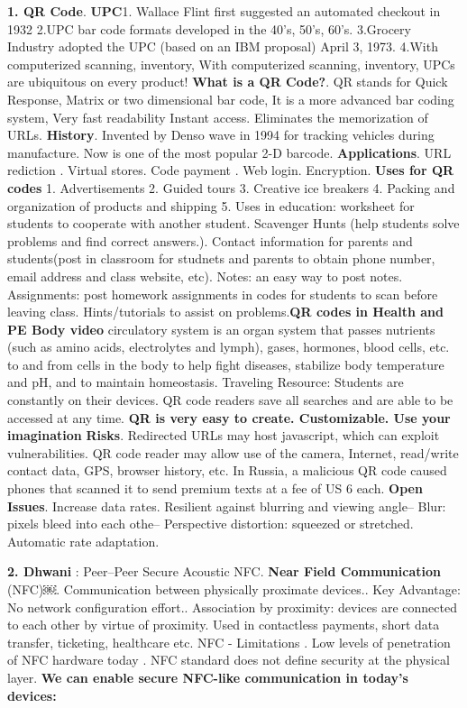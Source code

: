 \documentclass[8pt]{extarticle}
\begin{document}
\begin{multicols}{2}
\textbf{1. QR Code}. \textbf{UPC}1. Wallace Flint first suggested an automated checkout in 1932 2.UPC bar code formats developed in the 40’s, 50’s, 60’s. 3.Grocery Industry adopted the UPC (based on an IBM proposal) April 3, 1973. 4.With computerized scanning, inventory, With computerized scanning, inventory, UPCs are ubiquitous on every product! \textbf{What is a QR Code?}. QR stands for Quick Response, Matrix or two dimensional bar code, It is a more advanced bar coding system, Very fast readability Instant access. Eliminates the memorization of URLs. \textbf{History}. Invented by Denso wave in 1994 for tracking vehicles during manufacture. Now is one of the most popular 2-D barcode. \textbf{Applications}. URL rediction . Virtual stores. Code payment . Web login. Encryption. \textbf{Uses for QR codes} 1. Advertisements 2. Guided tours 3. Creative ice breakers 4. Packing and organization of products and shipping 5. Uses in education: worksheet for students to cooperate with another student. Scavenger Hunts (help students solve problems and find correct answers.). Contact information for parents and students(post in classroom for studnets and parents to obtain phone number, email address and class website, etc). Notes: an easy way to post notes. Assignments: post homework assignments in codes for students to scan before leaving class. Hints/tutorials to assist on problems.\textbf{QR codes in Health and PE Body video} circulatory system is an organ system that passes nutrients (such as amino acids, electrolytes and lymph), gases, hormones, blood cells, etc. to and from cells in the body to help fight diseases, stabilize body temperature and pH, and to maintain homeostasis. Traveling Resource: 
Students are constantly on their devices. QR code readers save all searches and are able to be accessed at any time. \textbf{QR is very easy to create. Customizable. Use your imagination} \textbf{Risks}. Redirected URLs may host javascript, which can exploit vulnerabilities. QR code reader may allow use of the camera, Internet, read/write contact data, GPS, browser history, etc. In Russia, a malicious QR code caused phones that scanned it to send premium texts at a fee of US 6 each.\textbf{ Open Issues}. Increase data rates. Resilient against blurring and viewing angle– Blur: pixels bleed into each othe– Perspective distortion: squeezed or stretched. Automatic rate adaptation.

\textbf{2. Dhwani} : Peer–Peer Secure Acoustic NFC. \textbf{Near Field Communication} (NFC)￼. Communication between physically proximate devices.. Key Advantage: No network configuration effort.. Association by proximity: devices are connected to each other by virtue of proximity. Used in contactless payments, short data transfer, ticketing, healthcare etc. NFC - Limitations
. Low levels of penetration of NFC hardware today
. NFC standard does not define security at the physical layer. \textbf{We can enable secure NFC-like communication in today's devices:} 


\end{multicols}
\end{document}
